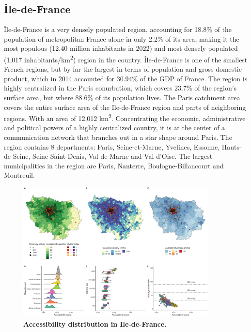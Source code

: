 \subsection*{Île-de-France}

Île-de-France is a very densely populated region, accounting for 18.8\% of the population of metropolitan France alone in only 2.2\% of its area, making it the most populous (12.40 million inhabitants in 2022) and most densely populated (1,017 inhabitants/km\textsuperscript{2}) region in the country. Île-de-France is one of the smallest French regions, but by far the largest in terms of population and gross domestic product, which in 2014 accounted for 30.94\% of the GDP of France. The region is highly centralized in the Paris conurbation, which covers 23.7\% of the region's surface area, but where 88.6\% of its population lives. The Paris catchment area covers the entire surface area of the Ile-de-France region and parts of neighboring regions. With an area of 12,012 km\textsuperscript{2}. Concentrating the economic, administrative and political powers of a highly centralized country, it is at the center of a communication network that branches out in a star shape around Paris. The region contains 8 departments: Paris, Seine-et-Marne, Yvelines, Essonne, Hauts-de-Seine, Seine-Saint-Denis, Val-de-Marne and Val-d'Oise. The largest municipalities in the region are Paris, Nanterre, Boulogne-Billancourt and Montreuil.

\begin{figure}[H]
    \includegraphics[width=0.9\textwidth]{images/camion/region_accessibility/accessibility_Ile-de-France.png}
    \centering
    \caption{
        \textbf{Accessibility distribution in Ile-de-France.}
    }
\end{figure}

